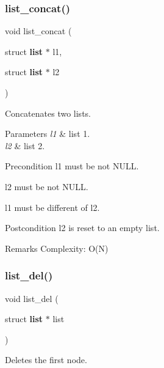 \subsubsection{list\+\_\+concat()}
{\footnotesize\ttfamily void list\+\_\+concat (\begin{DoxyParamCaption}\item[{struct \textbf{ list} $\ast$}]{l1,  }\item[{struct \textbf{ list} $\ast$}]{l2 }\end{DoxyParamCaption})\hspace{0.3cm}{\ttfamily [inline]}}

Concatenates two lists.


\begin{DoxyParams}{Parameters}
{\em l1} & list 1. \\
\hline
{\em l2} & list 2.\\
\hline
\end{DoxyParams}
\begin{DoxyPrecond}{Precondition}
{\ttfamily l1} must be not N\+U\+LL. 

{\ttfamily l2} must be not N\+U\+LL. 

{\ttfamily l1} must be different of {\ttfamily l2}.
\end{DoxyPrecond}
\begin{DoxyPostcond}{Postcondition}
{\ttfamily l2} is reset to an empty list.
\end{DoxyPostcond}
\begin{DoxyRemark}{Remarks}
Complexity\+: O(\+N) 
\end{DoxyRemark}
\mbox{\label{list_8c_a4ee9116bc5b8f1b5da93f415d8529d58}} 
\subsubsection{list\+\_\+del()}
{\footnotesize\ttfamily void list\+\_\+del (\begin{DoxyParamCaption}\item[{struct \textbf{ list} $\ast$}]{list }\end{DoxyParamCaption})\hspace{0.3cm}{\ttfamily [inline]}}

Deletes the first node.


